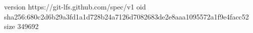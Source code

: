 version https://git-lfs.github.com/spec/v1
oid sha256:680c2d6b29a3fd1a1d728b24a7126d7082683de2e8aaa1095572a1f9e4facc52
size 349692
